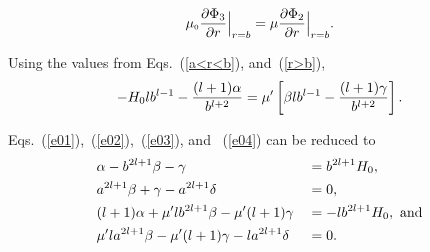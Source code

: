 
$$\mu_{\scriptscriptstyle 0}\frac{\partial \Phi_3}{\partial r}\Bigr|_{\substack{r=b}}=\mu\frac{\partial \Phi_2}{\partial r}\Bigr|_{\substack{r=b}}{\rm .}$$

Using the values from Eqs.~(\ref{a<r<b}), and~(\ref{r>b}),
\begin{equation}\label{e04}
-H_0lb^{l-1}-\frac{(l+1)\alpha}{b^{l+2}}=\mu'\left[\beta l b^{l-1}-\frac{(l+1)\gamma}{b^{l+2}}\right]{\rm .}
\end{equation}





Eqs.~(\ref{e01}),~(\ref{e02}),~(\ref{e03}), and ~(\ref{e04}) can be reduced to
\begin{align}
    &\alpha- b^{2l+1}\beta-\gamma & &=b^{2l+1}H_0{\rm ,}\label{e1}\\
    &a^{2l+1}\beta+\gamma-a^{2l+1}\delta &&=0{\rm ,}\label{e2}\\
    &(l+1)\alpha+\mu' l b^{2l+1}\beta-\mu'(l+1)\gamma &&=-lb^{2l+1}H_0{\rm ,~and}\label{e3}\\
    &\mu'l a^{2l+1}\beta -\mu'(l+1)\gamma- l a^{2l+1}\delta &&=0{\rm .}\label{e4}
\end{align}

